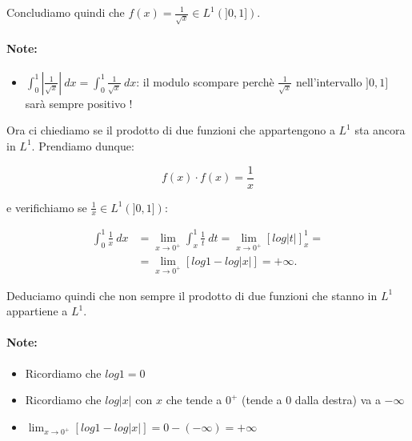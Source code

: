 Concludiamo quindi che $f(x) = \frac{1}{\sqrt{x}} \in L^1(]0, 1])$.

\paragraph{Note:}
\begin{itemize}
    \item $\int_{0}^{1} |\frac{1}{\sqrt{x}}| \ dx = \int_{0}^{1}
              \frac{1}{\sqrt{x}} \ dx$: il modulo scompare perchè
          $\frac{1}{\sqrt{x}}$ nell'intervallo $]0, 1]$ sarà sempre positivo
          !
          
\end{itemize}

\vspace{1cm}

Ora ci chiediamo se il prodotto di due funzioni che appartengono a $L^1$ sta
ancora in $L^1$. Prendiamo dunque:

$$
    f(x) \cdot f(x) = \frac{1}{x}
$$

e verifichiamo se $\frac{1}{x} \in L^1(]0, 1])$:

\begin{equation}
    \begin{aligned}
        \int_{0}^{1} \frac{1}{x} \ dx & = \lim_{x \rightarrow 0^+} \int_{x}^{1} \frac{1}{t} \ dt = \lim_{x \rightarrow 0^+} [log |t|]_{x}^{1} = \\
                                      & = \lim_{x \rightarrow 0^+} [log 1 - log|x|] = +\infty.
    \end{aligned}
\end{equation}

Deduciamo quindi che non sempre il prodotto di due funzioni che stanno in $L^1$
appartiene a $L^1$.

\paragraph{Note:}
\begin{itemize}
    \item Ricordiamo che $log 1 = 0$
    \item Ricordiamo che $log |x|$ con $x$ che tende a $0^+$ (tende a 0 dalla
          destra) va a $-\infty$
          
    \item $\lim_{x \rightarrow 0^+} [log 1 - log|x|] = 0 - (-\infty) = +\infty$
\end{itemize}

